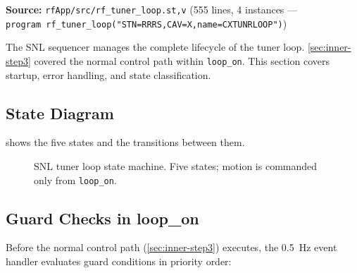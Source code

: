 \textbf{Source:} \texttt{rfApp/\allowbreak{}src/\allowbreak{}rf\_\allowbreak{}tuner\_\allowbreak{}loop.\allowbreak{}st,\allowbreak{}v} (555 lines, 4 instances --- \texttt{program\ rf\_\allowbreak{}tuner\_\allowbreak{}loop("STN=\allowbreak{}RRRS,\allowbreak{}CAV=\allowbreak{}X,\allowbreak{}name=\allowbreak{}CXTUNRLOOP")})

The SNL sequencer manages the complete lifecycle of the tuner loop. \cref{sec:inner-step3} covered the normal control path within \texttt{loop\_on}. This section covers startup, error handling, and state classification.

\subsection{State Diagram}\label{sec:state-diagram}


 shows the five states and the transitions between them.

\begin{figure}[tbp]
\centering
\begin{fitpicture}\end{fitpicture}
\caption{SNL tuner loop state machine. Five states; motion is commanded only from \texttt{loop\_on}.}\label{fig:loop-states}
\end{figure}

\subsection{Guard Checks in loop\_on}\label{sec:guards}


Before the normal control path (\cref{sec:inner-step3}) executes, the \qty{0.5}{\hertz} event handler evaluates guard conditions in priority order:

